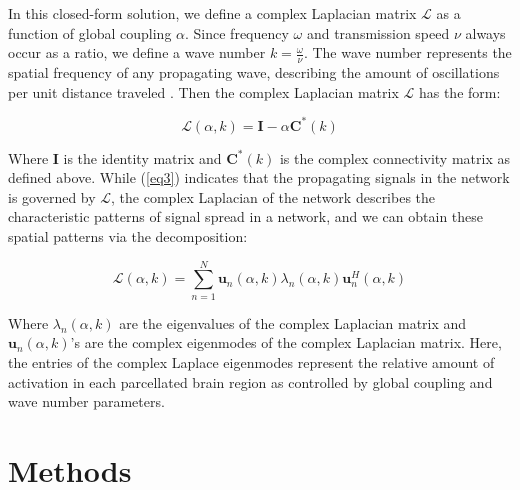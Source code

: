\documentclass{article}
\begin{document}
In this closed-form solution, we define a complex Laplacian matrix $\mathcal{L}$ as a function of global coupling $\alpha$. Since frequency $\omega$ and transmission speed $\nu$ always occur as a ratio, we define a wave number $k = \frac{\omega}{\nu}$. The wave number represents the spatial frequency of any propagating wave, describing the amount of oscillations per unit distance traveled \cite{French1971}. Then the complex Laplacian matrix $\mathcal{L}$ has the form:

\begin{equation}
    \label{eq4}
    \mathcal{L}(\alpha, k) = \pmb{I} - \alpha \pmb{C}^{*}(k)
\end{equation}

Where $\pmb{I}$ is the identity matrix and $\pmb{C}^{*}(k)$ is the complex connectivity matrix as defined above. While (\ref{eq3}) indicates that the propagating signals in the network is governed by $\mathcal{L}$, the complex Laplacian of the network describes the characteristic patterns of signal spread in a network, and we can obtain these spatial patterns via the decomposition:

\begin{equation}
\label{eq5}
\bm{\mathcal{L}}(\alpha, k) = \sum_{n = 1}^{N} \bm{u}_{n}(\alpha, k)\lambda_{n}(\alpha, k)\bm{u}_{n}^{H}(\alpha, k)
\end{equation}

Where $\lambda_{n}(\alpha, k)$ are the eigenvalues of the complex Laplacian matrix and $\bm{u}_{n}(\alpha, k)$'s are the complex eigenmodes of the complex Laplacian matrix. Here, the entries of the complex Laplace eigenmodes represent the relative amount of activation in each parcellated brain region as controlled by global coupling and wave number parameters.

\section{Methods}
\label{sec:methods}
\end{document}
